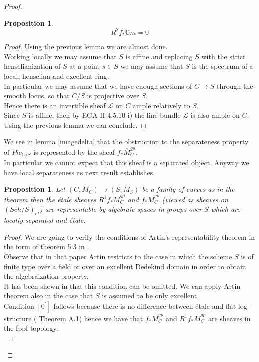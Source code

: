 \documentclass{amsart}
\newtheorem{prop}[thm]{Proposition}
\theoremstyle{definition}
\numberwithin{equation}{section}
\begin{document}
\begin{proof}
\begin{prop}
$$
R^2f_{*}{\mathbb{G}m} =0
$$
\end{prop}
\begin{proof}
Using the previous lemma we are almost done.\\
Working locally we may assume that $S$ is affine and replacing $S$ with the strict henselianization of $S$ at a point $s\in S$ we may assume that $S$ is the spectrum of a local, henselian and excellent ring. \\
In particular we may assume that we have enough sections of $C{\rightarrow} S$ through the smooth locus, so that $C/S$ is projective over $S$.\\ 
Hence there is an invertible sheaf $\mathcal{L}$ on $C$ ample relatively to $S$.\\
Since $S$ is affine, then by EGA II 4.5.10 i) the line bundle $\mathcal{L}$ is also ample on $C$. Using the previous lemma we can conclude.
\end{proof}

\noindent We see in lemma \ref{imagedelta} that the obstruction to the separateness property of $Pic_{C/S}$ is represented by the sheaf $f_{*}\overline{M}_C^{gp}$. \\
In particular we cannot expect that this sheaf is a separated object. Anyway we have local separateness as next result establishes.
\begin{prop}\label{mbaralgsp}
  Let $(C,M_C){\rightarrow} (S,M_S)$ be a family of curves as in the theorem then the \'etale sheaves 
$
R^{1}f_{*}\overline{M}_{C}^{gp}
$
 and  
 $f_{*}\overline{M}_{C}^{gp}$ (viewed as sheaves on $(Sch/S)_{et}$) are representable by algebraic spaces in groups over $S$ which are locally separated and \'etale.
\end{prop}

\begin{proof}
    We are going to verify the conditions of Artin's representability theorem in the form of theorem 5.3 in \cite{aalg}. \\
Observe that in that paper Artin restricts to the case in which the scheme $S$ is of finite type over a field or over an excellent Dedekind domain in order to obtain the algebraization property.\\
It has been shown in \cite{cdej} that this condition can be omitted. We can apply Artin theorem also in the case that $S$ is assumed to be only excellent.\\

\noindent Condition $[0^{\prime}]$ follows because there is no difference between \'etale and flat log-structure (\cite{ollog} Theorem A.1) hence we have that $f_{*}\overline{M}_{C}^{gp}$ and $R^1f_{*}\overline{M}_{C}^{gp}$ are sheaves in the fppf topology.\\


\end{proof}
\end{proof}
\end{document}

